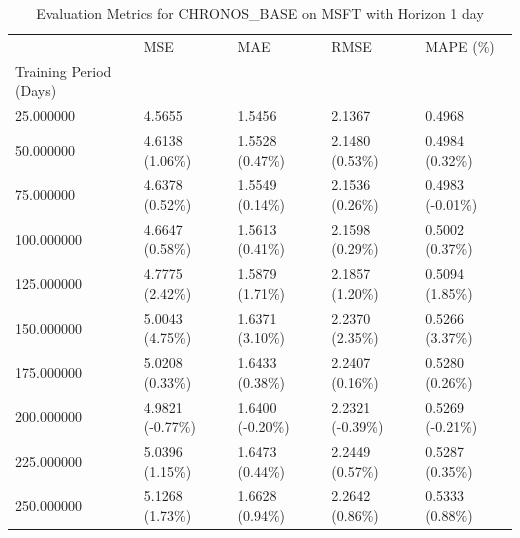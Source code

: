 \begin{table}
\caption{Evaluation Metrics for CHRONOS_BASE on MSFT with Horizon 1 day}
\label{tab:chronos_base_MSFT_h1_metrics}
\begin{tabular}{lllll}
\toprule
 & MSE & MAE & RMSE & MAPE (\%) \\
Training Period (Days) &  &  &  &  \\
\midrule
25.000000 & 4.5655 & 1.5456 & 2.1367 & 0.4968 \\
50.000000 & 4.6138 (1.06\%) & 1.5528 (0.47\%) & 2.1480 (0.53\%) & 0.4984 (0.32\%) \\
75.000000 & 4.6378 (0.52\%) & 1.5549 (0.14\%) & 2.1536 (0.26\%) & 0.4983 (-0.01\%) \\
100.000000 & 4.6647 (0.58\%) & 1.5613 (0.41\%) & 2.1598 (0.29\%) & 0.5002 (0.37\%) \\
125.000000 & 4.7775 (2.42\%) & 1.5879 (1.71\%) & 2.1857 (1.20\%) & 0.5094 (1.85\%) \\
150.000000 & 5.0043 (4.75\%) & 1.6371 (3.10\%) & 2.2370 (2.35\%) & 0.5266 (3.37\%) \\
175.000000 & 5.0208 (0.33\%) & 1.6433 (0.38\%) & 2.2407 (0.16\%) & 0.5280 (0.26\%) \\
200.000000 & 4.9821 (-0.77\%) & 1.6400 (-0.20\%) & 2.2321 (-0.39\%) & 0.5269 (-0.21\%) \\
225.000000 & 5.0396 (1.15\%) & 1.6473 (0.44\%) & 2.2449 (0.57\%) & 0.5287 (0.35\%) \\
250.000000 & 5.1268 (1.73\%) & 1.6628 (0.94\%) & 2.2642 (0.86\%) & 0.5333 (0.88\%) \\
\bottomrule
\end{tabular}
\end{table}
